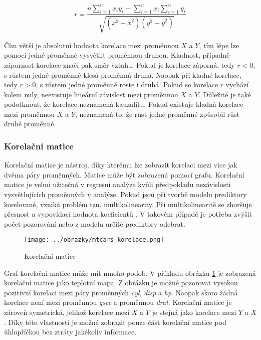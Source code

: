 \begin{equation}
r = \frac{n \sum_{i=1}^n x_i y_i - \sum_{i=1}^n x_i \sum_{i=1}^n y_i}
{\sqrt{(\overline{x^2} - \overline{x}^2)(\overline{y^2} - \overline{y}^2)}}
\end{equation}

Čím větší je absolutní hodnota korelace mezi proměnnou $X$ a $Y$, tím lépe lze pomocí jedné proměnné vysvětlit proměnnou druhou. Kladnost, případně zápornost korelace
značí pak směr vztahu. Pokud je korelace záporná, tedy $r < 0$, s růstem jedné proměnné klesá proměnná druhá. Naopak při kladné korelace, tedy $r > 0$, s růstem
jedné proměnné roste i druhá.
{\color{red}
Pokud se korelace $r$ vychází kolem nuly, neexistuje lineární závislost mezi proměnnou $X$ a $Y$. Důležité je také podotknout, že korelace neznamená kauzalitu. Pokud
existuje kladná korelace mezi proměnnou $X$ a $Y$, neznamená to, že růst jedné proměnné způsobil růst druhé proměnné.  
}

\subsubsection{Korelační matice}
Korelační matice je nástroj, díky kterému lze zobrazit korelaci mezi více jak dvěma páry proměnných. Matice může být zobrazená
{\color{red}
pomocí grafu.
}
Korelační matice je velmi užitečná v regresní analýze kvůli předpokladu nezávislosti
{\color{red}
vysvětlujících proměnných v analýze.
}
Pokud jsou při tvorbě modelu prediktory korelované,
vzniká problém tzn. multikolinearity. Při multikolinearitě se zhoršuje přesnost a vypovídací hodnota koeficientů \cite{kleinbaum_logistic_2010}.
V takovém případě je potřeba zvýšit počet pozorování nebo z modelu určité prediktory odebrat. 

\begin{figure}[H]
    \centering
    \texttt{[image: ../obrazky/mtcars\_korelace.png]}
    \caption{Korelační matice} 
    \label{fig:mtcars_korelace}
\end{figure}

Graf korelační matice může mít mnoho podob. V příkladu obrázku \ref{fig:mtcars_korelace} je zobrazená korelační matice jako teplotní mapa. Z obrázku je možné pozorovat vysokou
pozitivní korelaci mezi páry proměnných \textit{cyl}, \textit{disp} a \textit{hp}. Naopak skoro žádná korelace není mezi proměnnou \textit{qsec} a proměnnou \textit{drat}.
Korelační matice je zároveň symetrická, jelikož korelace mezi $X$ a $Y$ je stejná jako korelace mezi $Y$ a $X$. Díky této vlastnosti je možné zobrazit pouze část 
korelační matice pod úhlopříčkou bez ztráty jakékoliv informace.


